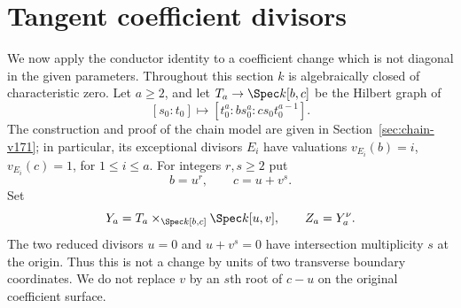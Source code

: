 \section{Tangent coefficient divisors}
\label{sec:tangent-v171}
We now apply the conductor identity to a coefficient change which is
not diagonal in the given parameters. Throughout this section $k$ is
algebraically closed of characteristic zero. Let $a\geq2$, and let
$T_a\to\Spec k[b,c]$ be the Hilbert graph of
\[
 [s_0:t_0]\longmapsto[t_0^a:b s_0^a:cs_0t_0^{a-1}].
\]
The construction and proof of the chain model are given in
Section~\ref{sec:chain-v171}; in particular, its exceptional divisors
$E_i$ have valuations $v_{E_i}(b)=i$, $v_{E_i}(c)=1$, for $1\leq i\leq a$.
For integers $r,s\geq2$ put
\begin{equation}\label{eq:tangent-cover-v171}
 b=u^r,\qquad c=u+v^s.
\end{equation}
Set
\[
 Y_a=T_a\times_{\Spec k[b,c]}\Spec k[u,v],\qquad Z_a=Y_a^\nu.
\]
The two reduced divisors $u=0$ and $u+v^s=0$ have intersection
multiplicity $s$ at the origin. Thus this is not a change by units of
two transverse boundary coordinates. We do not replace $v$ by an
$s$th root of $c-u$ on the original coefficient surface.

